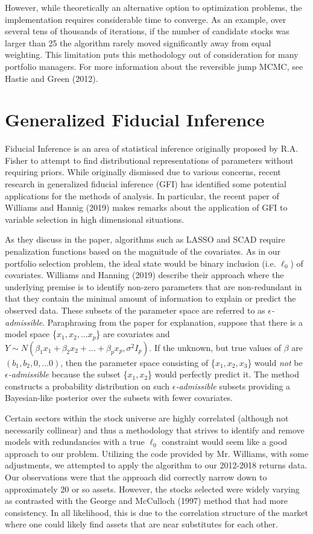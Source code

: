\documentclass[a4paper, 12pt]{article}
\theoremstyle{plain}
\theoremstyle{definition}
\theoremstyle{remark}
\begin{document}
However, while theoretically an alternative option to optimization problems, the implementation requires considerable time to converge. As an example, over several tens of thousands of iterations, if the number of candidate stocks was larger than 25 the algorithm rarely moved significantly away from equal weighting. This limitation puts this methodology out of consideration for many portfolio managers.
For more information about the reversible jump MCMC, see Hastie and Green (2012).

\section{Generalized Fiducial Inference}
Fiducial Inference is an area of statistical inference originally proposed by R.A. Fisher to attempt to find distributional representations of parameters without requiring priors. While originally dismissed due to various concerns, recent research in generalized fiducial inference (GFI) has identified some potential applications for the methods of analysis. In particular, the recent paper of Williams and Hannig (2019) makes remarks about the application of GFI to variable selection in high dimensional situations.

As they discuss in the paper, algorithms such as LASSO and SCAD require penalization functions based on the magnitude of the covariates. As in our portfolio selection problem, the ideal state would be binary inclusion (i.e. $\ell_0$) of covariates. Williams and Hanning (2019) describe their approach where the underlying premise is to identify non-zero parameters that are non-redundant in that they contain the minimal amount of information to explain or predict the observed data. These subsets of the parameter space are referred to as \textit{$\epsilon$-admissible}. Paraphrasing from the paper for explanation, suppose that there is a model space \{$x_1, x_2, ... x_p$\} are covariates and $Y \sim N(\beta_1 x_1 + \beta_2 x_2 + ... +\beta_p x_p, \sigma^2 I_p)$. If the unknown, but true values of \textbf{$\beta$} are $(b_1,b_2,0,...0)$, then the parameter space consisting of \{$x_1, x_2, x_3$\} would \textit{not} be \textit{$\epsilon$-admissible} because the subset \{$x_1, x_2$\} would perfectly predict it. The method constructs a probability distribution on such \textit{$\epsilon$-admissible} subsets providing a Bayesian-like posterior over the subsets with fewer covariates.

Certain sectors within the stock universe are highly correlated (although not necessarily collinear) and thus a methodology that strives to identify and remove models with redundancies with a true $\ell_0$ constraint would seem like a good approach to our problem. Utilizing the code provided by Mr. Williams, with some adjustments, we attempted to apply the algorithm to our 2012-2018 returns data. Our observations were that the approach did correctly narrow down to approximately 20 or so assets. However, the stocks selected were widely varying as contrasted with the George and McCulloch (1997) method that had more consistency. In all likelihood, this is due to the correlation structure of the market where one could likely find assets that are near substitutes for each other.
\end{document}
